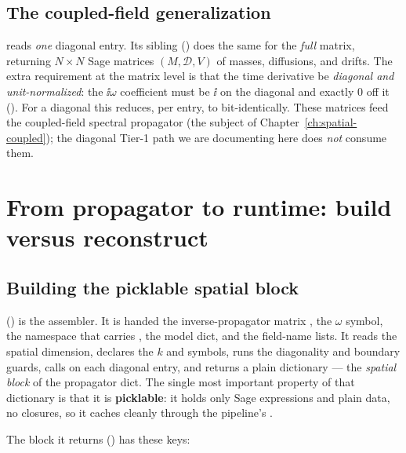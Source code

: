 \subsection{The coupled-field generalization}

 reads \emph{one} diagonal entry. Its sibling
 () does the same
for the \emph{full} matrix, returning $N\times N$ Sage matrices $(M,\mathcal{D},V)$
of masses, diffusions, and drifts. The extra requirement at the matrix level is
that the time derivative be \emph{diagonal and unit-normalized}: the $\ii\omega$
coefficient must be $\ii$ on the diagonal and exactly $0$ off it
(). For a diagonal  this reduces, per
entry, to  bit-identically. These matrices feed
the coupled-field spectral propagator (the subject of
Chapter~\ref{ch:spatial-coupled}); the diagonal Tier-1 path we are documenting
here does \emph{not} consume them.

\section{From propagator to runtime: build versus reconstruct}\label{sec:hk-build}

\subsection{Building the picklable spatial block}

 () is the assembler.
It is handed the inverse-propagator matrix , the $\omega$ symbol, the
namespace  that carries , the model dict, and the
field-name lists. It reads the spatial dimension, declares the $k$ and
 symbols, runs the diagonality and boundary guards, calls
 on each diagonal entry, and returns a plain
dictionary --- the \emph{spatial block} of the propagator dict. The single most
important property of that dictionary is that it is \textbf{picklable}: it holds
only Sage expressions and plain data, no closures, so it caches cleanly through
the pipeline's .

The block it returns () has these keys:

